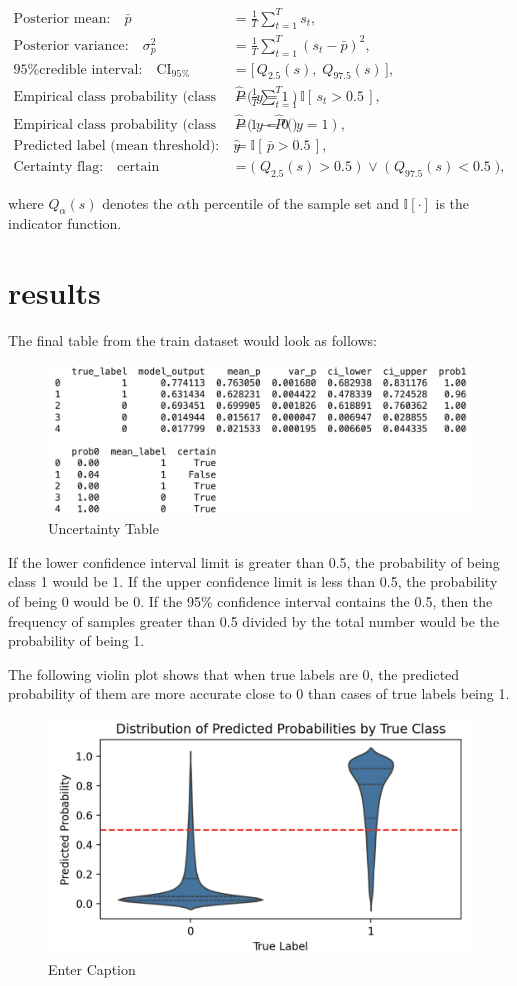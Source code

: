 \documentclass{article}
\begin{document}
\begin{align}
\text{Posterior mean:} \quad
\bar{p} &= \frac{1}{T} \sum_{t=1}^{T} s_t, \\[6pt]
\text{Posterior variance:} \quad
\sigma_p^2 &= \frac{1}{T} \sum_{t=1}^{T} (s_t - \bar{p})^2, \\[6pt]
\text{95\% credible interval:} \quad
\mathrm{CI}_{95\%} &= \big[\, Q_{2.5}(s),\; Q_{97.5}(s) \,\big], \\[6pt]
\text{Empirical class probability (class 1):} \quad
\hat{P}(y=1) &= \frac{1}{T} \sum_{t=1}^{T} \mathbb{I}[\,s_t > 0.5\,], \\[6pt]
\text{Empirical class probability (class 0):} \quad
\hat{P}(y=0) &= 1 - \hat{P}(y=1), \\[6pt]
\text{Predicted label (mean threshold):} \quad
\hat{y} &= \mathbb{I}[\,\bar{p} > 0.5\,], \\[6pt]
\text{Certainty flag:} \quad
\mathrm{certain} &= \big(\; Q_{2.5}(s) > 0.5 \;\big) \;\lor\; \big(\; Q_{97.5}(s) < 0.5 \;\big),
\end{align}

where $Q_{\alpha}(s)$ denotes the $\alpha$th percentile of the sample set and $\mathbb{I}[\cdot]$ is the indicator function.




\section{results}
The final table from the train dataset would look as follows:
\begin{figure}
    \centering
    \includegraphics[width=0.7\linewidth]{table.png}
    \caption{Uncertainty Table}
    \label{fig:placeholder}
\end{figure}
If the lower confidence interval limit is greater than 0.5, the probability of being class 1 would be 1. If the upper confidence limit is less than 0.5, the probability of being 0 would be 0. If the 95\% confidence interval contains the 0.5, then the frequency of samples greater than 0.5 divided by the total number would be the probability of being 1.

The following violin plot shows that when true labels are 0, the predicted probability of them are more accurate close to 0 than cases of true labels being 1. 
\begin{figure}
    \centering
    \includegraphics[width=0.5\linewidth]{violin.png}
    \caption{Enter Caption}
    \label{fig:placeholder}
\end{figure}
\end{document}
